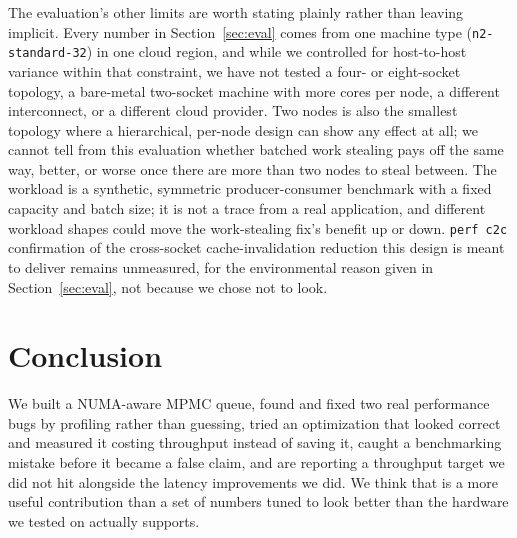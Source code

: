 \documentclass[10pt,journal,compsoc]{IEEEtran}
\begin{document}
The evaluation's other limits are worth stating plainly rather than leaving implicit. Every number
in Section~\ref{sec:eval} comes from one machine type (\texttt{n2-standard-32}) in one cloud
region, and while we controlled for host-to-host variance within that constraint, we have not
tested a four- or eight-socket topology, a bare-metal two-socket machine with more cores per
node, a different interconnect, or a different cloud provider. Two nodes is also the smallest
topology where a hierarchical, per-node design can show any effect at all; we cannot tell from
this evaluation whether batched work stealing pays off the same way, better, or worse once there
are more than two nodes to steal between. The workload is
a synthetic, symmetric producer-consumer benchmark with a fixed capacity and batch size; it is not
a trace from a real application, and different workload shapes could move the work-stealing fix's
benefit up or down. \texttt{perf c2c} confirmation of the cross-socket cache-invalidation reduction
this design is meant to deliver remains unmeasured, for the environmental reason given in
Section~\ref{sec:eval}, not because we chose not to look.

\section{Conclusion}

We built a NUMA-aware MPMC queue, found and fixed two real performance bugs by profiling rather
than guessing, tried an optimization that looked correct and measured it costing throughput instead
of saving it, caught a benchmarking mistake before it became a false claim, and are reporting a
throughput target we did not hit alongside the latency improvements we did. We think that is a more
useful contribution than a set of numbers tuned to look better than the hardware we tested on
actually supports.



\end{document}
